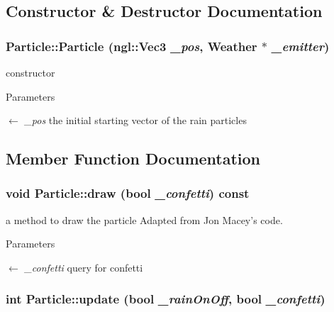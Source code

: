 \subsection{Constructor \& Destructor Documentation}
\hypertarget{classParticle_a46486946487f51b9f8b2095c61f6dfaa}{
\subsubsection[{Particle}]{\setlength{\rightskip}{0pt plus 5cm}Particle::Particle (ngl::Vec3 {\em \_\-pos}, \/  {\bf Weather} $\ast$ {\em \_\-emitter})}}
\label{classParticle_a46486946487f51b9f8b2095c61f6dfaa}


constructor 
\begin{DoxyParams}{Parameters}
\item[\mbox{$\leftarrow$} {\em \_\-pos}]the initial starting vector of the rain particles \end{DoxyParams}


\subsection{Member Function Documentation}
\hypertarget{classParticle_ac38af466dd01764587bc00ee7b6a2e90}{
\subsubsection[{draw}]{\setlength{\rightskip}{0pt plus 5cm}void Particle::draw (bool {\em \_\-confetti}) const}}
\label{classParticle_ac38af466dd01764587bc00ee7b6a2e90}


a method to draw the particle Adapted from Jon Macey's code.


\begin{DoxyParams}{Parameters}
\item[\mbox{$\leftarrow$} {\em \_\-confetti}]query for confetti \end{DoxyParams}
\hypertarget{classParticle_a6633cb40b4601a8155f02513c36f41ce}{
\subsubsection[{update}]{\setlength{\rightskip}{0pt plus 5cm}int Particle::update (bool {\em \_\-rainOnOff}, \/  bool {\em \_\-confetti})}}
\label{classParticle_a6633cb40b4601a8155f02513c36f41ce}


